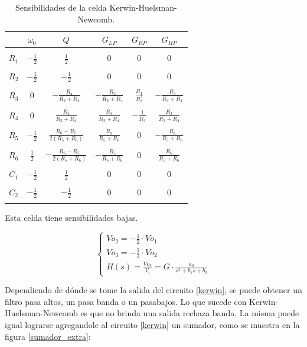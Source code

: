 \begin{table}[h!]
	\centering
	\begin{tabular}{c c c c c c}
		  & $\omega_0$ & $Q$ &$G_{LP}$ & $G_{BP}$& $G_{HP}$\\
		\hline \\
	$R_1$ & $-\frac{1}{2}$& $\frac{1}{2}$ & $0$& $0$&$0$\\ \\
	$R_2$ & $-\frac{1}{2}$& $-\frac{1}{2}$ & $0$& $0$& $0$\\ \\
	$R_3$ & $0$& $-\frac{R_4}{R_3+R_4}$ & $-\frac{R_3}{R_3+R_4}$&$\frac{R_4}{R_3^2}$ & $-\frac{R_3}{R_3+R_4}$\\ \\
	$R_4$ & $0$& $\frac{R_4}{R_3+R_4}$& $\frac{R_3}{R_3+R_4}$ &$-\frac{1}{R_3}$ & $\frac{R_3}{R_3+R_4}$\\ \\
	$R_5$ & $-\frac{1}{2}$&$\frac{R_6-R_5}{2(R_5+R_6)}$ & $\frac{R_5}{R_5+R_6}$&$0$ & $-\frac{R_6}{R_5+R_6}$\\ \\
	$R_6$ & $\frac{1}{2}$& $-\frac{R_6-R_5}{2(R_5+R_6)}$ & $-\frac{R_5}{R_5+R_6}$& $0$&$\frac{R_6}{R_5+R_6}$ \\ \\
	$C_1$ & $-\frac{1}{2}$& $\frac{1}{2}$ & $0$& $0$&$0$ \\ \\
	$C_2$ & $-\frac{1}{2}$& $-\frac{1}{2}$ & $0$ & $0$&$0$\\ \\
		\hline
	\end{tabular}
	\caption{Sensibilidades de la celda Kerwin-Huelsman-Newcomb.}
	\label{sens_k}
\end{table}

Esta celda tiene sensibilidades bajas.

\begin{equation}
\begin{cases}
Vo_2 = -\frac{1}{2} \cdot Vo_1\\
Vo_3 = -\frac{1}{2} \cdot Vo_2\\
H(s) = \frac{Vo_3}{V_i} = G \cdot \frac{a_0}{s^2 + b_1 s + b_0}
\label{int2eq}
\end{cases}
\end{equation}


Dependiendo de d\'onde se tome la salida del circuito \ref{kerwin}, se puede obtener un filtro pasa altos, un pasa banda o un pasabajos. Lo que sucede con Kerwin-Huelsman-Newcomb es que no brinda una salida rechaza banda. La misma puede igual lograrse agregandole al circuito \ref{kerwin} un sumador, como se muestra en la figura \ref{sumador_extra}:

